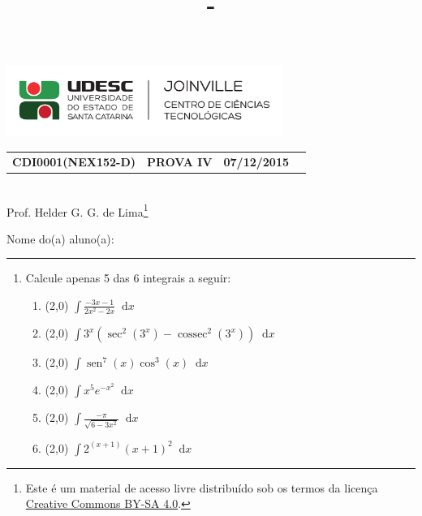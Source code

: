 \documentclass[12pt,a4paper]{article}
\author{\eu}
\title{\tipo - \disciplina}
\date{\data}
\newcommand*\diff{\mathop{}\!\mathrm{d}}
\newcommand*\sen{\operatorname{sen}}
\newcommand*\cosec{\operatorname{cossec}}
\newcommand*\tipo{PROVA IV}
\newcommand*\turma{NEX152-D}
\newcommand*\disciplina{CDI0001}
\newcommand*\eu{Helder G. G. de Lima}
\newcommand*\data{07/12/2015}
\begin{document}
\thispagestyle{empty}
\begin{center}
\includegraphics[width=9.0cm]{marca}
\noindent\begin{tabular}{l c c r}
  \textbf{\disciplina (\turma)}
& \textbf{\tipo}
& \textbf{\data}
\end{tabular}
\\ Prof. \eu\footnote{
Este é um material de acesso livre distribuído sob os termos da licença \href{https://creativecommons.org/licenses/by-sa/4.0/deed.pt_BR}{Creative Commons BY-SA 4.0}.}
\end{center}

\noindent Nome do(a) aluno(a): \rule{13cm}{0.01cm}

\begin{center}
\end{center}



\begin{enumerate}

\item Calcule apenas 5 das 6 integrais a seguir:

\begin{enumerate}
\item (2,0) $\displaystyle \int \frac{-3x-1}{2x^2-2x} \diff x$
\item (2,0) $\displaystyle \int 3^x(\sec^2(3^x)-\cosec^2(3^x)) \diff x$
\item (2,0) $\displaystyle \int \sen^7(x) \cos^3(x)\diff x$
\item (2,0) $\displaystyle \int x^5 e^{-x^2} \diff x$
\item (2,0) $\displaystyle \int \frac{-\pi}{\sqrt{6 - 3x^2}} \diff x$
\item (2,0) $\displaystyle \int 2^{(x+1)} (x+1)^2 \diff x$
\end{enumerate}
\end{enumerate}
\end{document}

